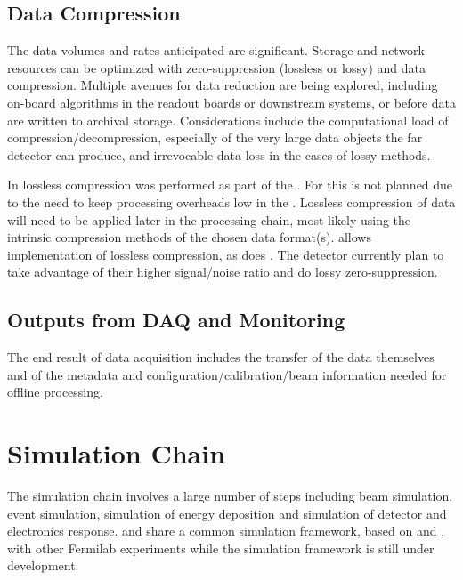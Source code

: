 \documentclass[../main-v1.tex]{subfiles}
\begin{document}
\subsection{Data Compression}
The data volumes and rates anticipated are significant. Storage and network resources can be optimized with zero-suppression (lossless or lossy) and data compression. Multiple avenues for data reduction are being explored, including on-board algorithms in the readout boards or downstream  systems, or before data are written to archival storage.  Considerations include the computational load of compression/decompression, especially of the very large data objects the far detector can produce, and irrevocable data loss in the cases of lossy methods.

In  lossless compression was performed as part of the . For  this is not planned due to the need to keep processing overheads low in the . Lossless compression of   data will need to be applied later in the processing chain, most likely using the intrinsic compression methods of the chosen data format(s).   allows implementation of lossless compression, as does .  The  detector currently plan to take advantage of their higher signal/noise ratio and do lossy zero-suppression. 


\subsection{Outputs from DAQ and Monitoring}

The end result of data acquisition includes the transfer of the data themselves and of the %
metadata and configuration/calibration/beam information needed for offline processing. 


\section{Simulation Chain }

% 
The  simulation chain involves a large number of steps including beam simulation, event simulation, simulation of energy deposition and simulation of detector and electronics response.  and  share a common simulation framework, based on  and , with other Fermilab  experiments while the  simulation framework is still under development. 
\end{document}
